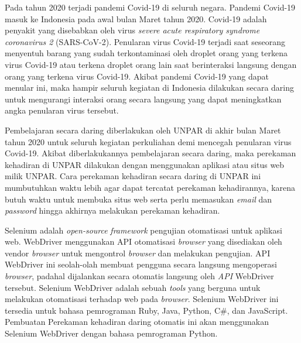 \documentclass[a4paper,twoside]{article}
\begin{document}
Pada tahun 2020 terjadi pandemi Covid-19 di seluruh negara. Pandemi Covid-19 masuk ke Indonesia pada awal bulan Maret tahun 2020. Covid-19 adalah penyakit yang disebabkan oleh virus \textit{severe acute respiratory syndrome coronavirus 2} (SARS-CoV-2). Penularan virus Covid-19 terjadi saat seseorang menyentuh barang yang sudah terkontaminasi oleh droplet orang yang terkena virus Covid-19 atau terkena droplet orang lain saat berinteraksi langsung dengan orang yang terkena virus Covid-19.  Akibat pandemi Covid-19 yang dapat menular ini, maka hampir seluruh kegiatan di Indonesia dilakukan secara daring untuk mengurangi interaksi orang secara langsung yang dapat meningkatkan angka penularan virus tersebut. 

Pembelajaran secara daring diberlakukan oleh UNPAR di akhir bulan Maret tahun 2020 untuk seluruh kegiatan perkuliahan demi mencegah penularan virus Covid-19. Akibat diberlakukannya pembelajaran secara daring, maka perekaman kehadiran di UNPAR dilakukan dengan menggunakan aplikasi atau situs web milik UNPAR. Cara perekaman kehadiran secara daring di UNPAR ini mumbutuhkan waktu lebih agar dapat tercatat perekaman kehadirannya, karena butuh waktu untuk membuka situs web serta perlu memasukan \textit{email} dan \textit{password} hingga akhirnya melakukan perekaman kehadiran. 

Selenium adalah \textit{open-source} \textit{framework} pengujian otomatisasi untuk aplikasi web. WebDriver menggunakan API otomatisasi \textit{browser} yang disediakan oleh vendor \textit{browser} untuk mengontrol \textit{browser} dan melakukan pengujian. API WebDriver ini seolah-olah membuat pengguna secara langsung mengoperasi \textit{browser}, padahal dijalankan secara otomatis langsung oleh \textit{API} WebDriver tersebut. Selenium WebDriver adalah sebuah \textit{tools} yang berguna untuk melakukan otomatisasi terhadap web pada \textit{browser}. Selenium WebDriver ini tersedia untuk bahasa pemrograman Ruby, Java, Python, C\#, dan JavaScript. Pembuatan Perekaman kehadiran daring otomatis ini akan menggunakan Selenium WebDriver dengan bahasa pemrograman Python.  
\end{document}
